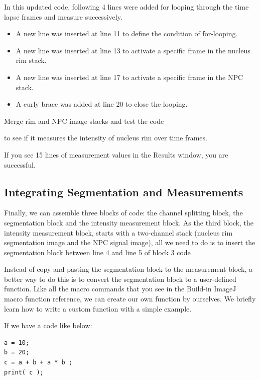 In this updated code, following 4 lines were added for looping through the time lapse frames and measure successively. 
\begin{itemize}
    \item A new line was inserted at line 11 to define the condition of for-looping.
    \item A new line was inserted at line 13 to activate a specific frame in the nucleus rim stack.
    \item A new line was inserted at line 17 to activate a specific frame in the NPC stack.
    \item A curly brace was added at line 20 to close the looping.
\end{itemize}

\begin{indentexercise}{4}
Merge rim and NPC image stacks and test the code 


to see if it measures the intensity of nucleus rim over time frames. 

If you see 15 lines of measurement values in the Results window, you are successful. 
\end{indentexercise}

\subsection{Integrating Segmentation and Measurements}

Finally, we can assemble three blocks of code: the channel splitting block, the segmentation block and the intensity measurement block. As the third block, the intensity measurement block, starts with a two-channel stack (nucleus rim segmentation image and the NPC signal image), all we need to do is to insert the segmentation block between line 4 and line 5 of block 3 code . 

Instead of copy and pasting the segmentation block to the measurement block, a better way to do this is to convert the segmentation block to a user-defined function. Like all the macro commands that you see in the Build-in ImageJ macro function reference, we can create our own function by ourselves. We briefly learn how to write a custom function with a simple example. 

If we have a code like below:

\begin{lstlisting}
a = 10;
b = 20;
c = a + b + a * b ;
print( c );
\end{lstlisting}

